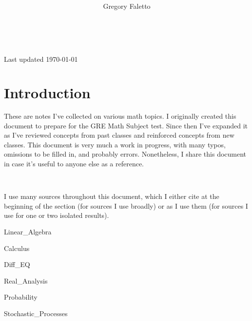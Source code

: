 \documentclass{book}
\title{
    \vspace{2in}
    \textmd{\textbf{ \hmwkTitle}}\\
}
\author{Gregory Faletto}
\date{}
\numberwithin{equation}{chapter}
\theoremstyle{definition}
\numberwithin{theorem}{section}
\theoremstyle{definition}
\theoremstyle{definition}
\theoremstyle{definition}
\theoremstyle{definition}
\theoremstyle{definition}
\theoremstyle{definition}
\begin{document}
\maketitle


\tableofcontents

\


\begin{center}
Last updated \today
\end{center}




\chapter{Introduction}

These are notes I've collected on various math topics. I originally created this document to prepare for the GRE Math Subject test. Since then I've expanded it as I've reviewed concepts from past classes and reinforced concepts from new classes. This document is very much a work in progress, with many typos, omissions to be filled in, and probably errors. Nonetheless, I share this document in case it's useful to anyone else as a reference.

\

I use many sources throughout this document, which I either cite at the beginning of the section (for sources I use broadly) or as I use them (for sources I use for one or two isolated results).

\pagebreak

{Linear_Algebra}

\pagebreak

{Calculus}

\pagebreak

{Diff_EQ}

\pagebreak

{Real_Analysis}

\pagebreak

{Probability}

\pagebreak

{Stochastic_Processes}

\pagebreak
\end{document}
